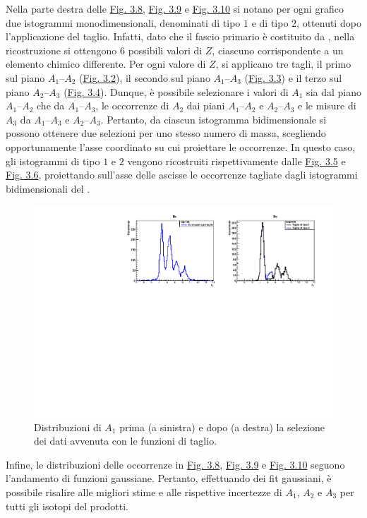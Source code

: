 \documentclass[12pt,a4paper,twoside]{report}
\begin{document}
	Nella parte destra delle \hyperref[fig:berillium1]{Fig. 3.8}, \hyperref[fig:berillium2]{Fig. 3.9} e \hyperref[fig:berillium3]{Fig. 3.10} si notano per ogni grafico due istogrammi monodimensionali, denominati di tipo $1$ e di tipo $2$, ottenuti dopo l'applicazione del taglio. Infatti, dato che il fascio primario è costituito da , nella ricostruzione si ottengono $6$ possibili valori di $Z$, ciascuno corrispondente a un elemento chimico differente. Per ogni valore di $Z$, si applicano tre tagli, il primo sul piano $A_1$--$A_2$ (\hyperref[fig:a1]{Fig. 3.2}), il secondo sul piano $A_1$--$A_3$ (\hyperref[fig:a2]{Fig. 3.3}) e il terzo sul piano $A_2$--$A_3$ (\hyperref[fig:a3]{Fig. 3.4}). Dunque, è possibile selezionare i valori di $A_1$ sia dal piano $A_1$--$A_2$ che da $A_1$--$A_3$, le occorrenze di $A_2$ dai piani $A_1$--$A_2$ e $A_2$--$A_3$ e le misure di $A_3$ da $A_1$--$A_3$ e $A_2$--$A_3$. Pertanto, da ciascun istogramma bidimensionale si possono ottenere due selezioni per uno stesso numero di massa, scegliendo opportunamente l'asse coordinato su cui proiettare le occorrenze. In questo caso, gli istogrammi di tipo $1$ e $2$ vengono ricostruiti rispettivamente dalle \hyperref[fig:a1_cut]{Fig. 3.5} e \hyperref[fig:a2_cut]{Fig. 3.6}, proiettando sull'asse delle ascisse le occorrenze tagliate dagli istogrammi bidimensionali del .
	\begin{figure}[H]
		\centering
		\includegraphics[width=1.0\linewidth]{c_Berillum1.pdf}
		\caption{Distribuzioni di $A_1$ prima (a sinistra) e dopo (a destra) la selezione dei dati avvenuta con le funzioni di taglio.}
		\label{fig:berillium1}
	\end{figure}
	Infine, le distribuzioni delle occorrenze in \hyperref[fig:berillium1]{Fig. 3.8}, \hyperref[fig:berillium2]{Fig. 3.9} e \hyperref[fig:berillium3]{Fig. 3.10} seguono l'andamento di funzioni gaussiane. Pertanto, effettuando dei fit gaussiani, è possibile risalire alle migliori stime e alle rispettive incertezze di $A_1$, $A_2$ e $A_3$ per tutti gli isotopi del  prodotti.
\end{document}
